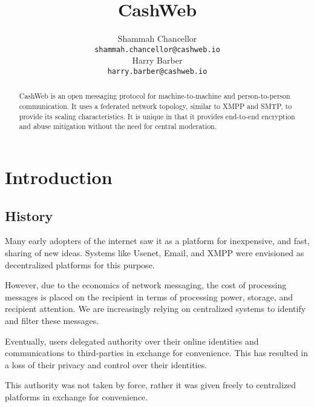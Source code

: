 \documentclass{article}
\title{CashWeb}
\author{
 Shammah Chancellor \\
 \texttt{shammah.chancellor@cashweb.io} \\
 \And
 Harry Barber \\
 \texttt{harry.barber@cashweb.io} \\
}
\begin{document}
\maketitle

\begin{abstract}
CashWeb is an open messaging protocol for machine-to-machine and person-to-person communication. It uses a federated network topology, similar to XMPP and SMTP, to provide its scaling characteristics. It is unique in that it provides end-to-end encryption and abuse mitigation without the need for central moderation.
\end{abstract}

\section{Introduction}

\subsection{History}

Many early adopters of the internet saw it as a platform for inexpensive, and fast, sharing of new ideas. Systems like Usenet\cite{rfc5536}\cite{rfc5537}, Email\cite{rfc5322}\cite{rfc1939}\cite{rfc5321}\cite{rfc4551}, and XMPP\cite{rfc3920}\cite{rfc3921}\cite{rfc3922}\cite{rfc3923} were envisioned as decentralized platforms for this purpose.


However, due to the economics of network messaging, the cost of processing messages is placed on the recipient in terms of processing power, storage, and recipient attention. We are increasingly relying on centralized systems to identify and filter these messages. 


Eventually, users delegated authority over their online identities and communications to third-parties in exchange for convenience. This has resulted in a loss of their privacy and control over their identities.


This authority was not taken by force, rather it was given freely to centralized platforms in exchange for convenience.
\end{document}
